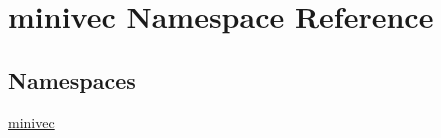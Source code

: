 \hypertarget{namespaceminivec}{}\section{minivec Namespace Reference}
\label{namespaceminivec}
\subsection*{Namespaces}
\begin{DoxyCompactItemize}
\item 
 \hyperlink{namespaceminivec_1_1minivec}{minivec}
\end{DoxyCompactItemize}
